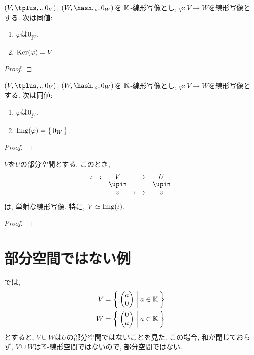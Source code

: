 \begin{prop}
  $(V,\plus,\act,0_V)$,
  $(W,\pplus,\aact,0_W)$を
  $\mathbb{K}$-線形写像とし,
  $\varphi\colon V\to W$を線形写像とする.
  次は同値:
  \begin{enumerate}
  \item $\varphi$は$\underline{0_W}$.
  \item $\operatorname{Ker}(\varphi)=V$
  \end{enumerate}
\end{prop}
\begin{proof}\end{proof}

\begin{prop}
  $(V,\plus,\act,0_V)$,
  $(W,\pplus,\aact,0_W)$を
  $\mathbb{K}$-線形写像とし,
  $\varphi\colon V\to W$を線形写像とする.
  次は同値:
  \begin{enumerate}
  \item $\varphi$は$\underline{0_W}$.
  \item $\operatorname{Img}(\varphi)=\Set{0_W}$.
  \end{enumerate}
\end{prop}
\begin{proof}\end{proof}

\begin{prop}
  $V$を$U$の部分空間とする.
  このとき,
  \begin{align*}
    \shazo{\iota}{V}{U}
    {v}{v}
  \end{align*}
  は, 単射な線形写像.
  特に, $V\simeq \operatorname{Img}(\iota)$.
\end{prop}
\begin{proof}\end{proof}


\section{部分空間ではない例}

\begin{example}
  では,
  \begin{align*}
    V&=\Set{\begin{pmatrix}a\\0\end{pmatrix}|a\in\mathbb{K}}\\
    W&=\Set{\begin{pmatrix}0\\a\end{pmatrix}|a\in\mathbb{K}}
  \end{align*}
  とすると, $V\cup W$は$U$の部分空間ではないことを見た.
  この場合, 和が閉じておらず, $V\cup W$は$\mathbb{K}$-線形空間ではないので,
  部分空間ではない.
\end{example}

